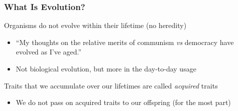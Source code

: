 \documentclass[10pt]{beamer}
\begin{document}
\begin{frame}[t]
\frametitle{What Is Evolution?}
\vspace{0.5cm}

	Organisms do not evolve within their lifetime (no heredity)\\
		\begin{itemize}
			\item ``My thoughts on the relative merits of communism \emph{vs} democracy have evolved as I've aged.''
			\smallskip
			\item Not biological evolution, but more in the day-to-day usage\\
		\end{itemize}
	
	\vspace{0.5cm}
	Traits that we accumulate over our lifetimes are called \textcolor{myblue}{\emph{acquired}} traits
		\smallskip
		\begin{itemize}
			\item We do not pass on acquired traits to our offspring (for the most part)
		\end{itemize}	
\end{frame}
\end{document}
